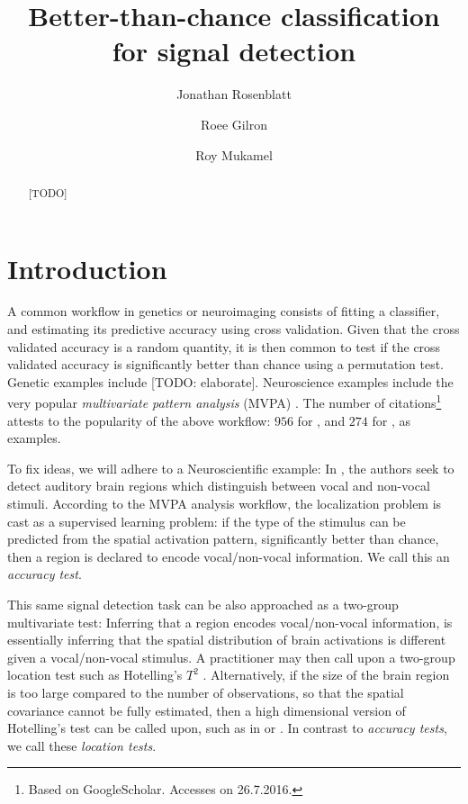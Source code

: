 \documentclass[12pt,a4paper]{article}
\author{Jonathan Rosenblatt \and Roee Gilron \and Roy Mukamel}
\title{Better-than-chance classification for signal detection}
\begin{document}


\maketitle
\linenumbers

\begin{abstract}
[TODO]
\end{abstract}


\section{Introduction}
\label{sec:introduction}






A common workflow in genetics or neuroimaging consists of fitting a classifier, and estimating its predictive accuracy using cross validation. 
Given that the cross validated accuracy is a random quantity, it is then common to test if the cross validated accuracy is significantly better than chance using a permutation test.  
Genetic examples include \cite{jiang_calculating_2008,radmacher_paradigm_2002-1} [TODO: elaborate].
Neuroscience examples include the very popular \emph{multivariate pattern analysis} (MVPA) \citep{golland_permutation_2003,kriegeskorte_information-based_2006,varoquaux_assessing_2016}.
The number of citations\footnote{Based on GoogleScholar. Accesses on 26.7.2016.} attests to the popularity of the above workflow: $956$ for \cite{kriegeskorte_information-based_2006}, and $274$ for \cite{radmacher_paradigm_2002-1}, as examples. 


To fix ideas, we will adhere to a Neuroscientific example: 
In \cite{gilron_quantifying_2016}, the authors seek to detect auditory brain regions which distinguish between vocal and non-vocal stimuli. 
According to the MVPA analysis workflow, the localization problem is cast as a supervised learning problem: if the type of the stimulus can be predicted from the spatial activation pattern, significantly better than chance, then a region is declared to encode vocal/non-vocal information. 
We call this an \emph{accuracy test}.

This same signal detection task can be also approached as a two-group multivariate test:
Inferring that a region encodes vocal/non-vocal information, is essentially inferring that the spatial distribution of brain activations is different given a vocal/non-vocal stimulus. 
A practitioner may then call upon a two-group location test such as Hotelling's $T^2$ \cite{fujikoshi_multivariate_2011}.
Alternatively, if the size of the brain region is too large compared to the number of observations, so that the spatial covariance cannot be fully estimated, then a high dimensional version of Hotelling's test can be called upon, such as in \cite{srivastava_testing_2013} or \cite{schafer_shrinkage_2005}.
In contrast to \emph{accuracy tests}, we call these \emph{location tests}.
\end{document}
